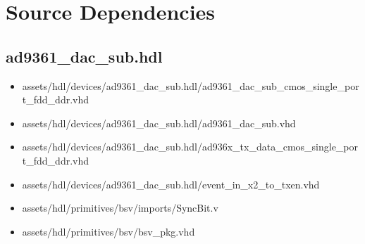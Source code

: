 \documentclass{article}
\def\comp{ad9361\_dac\_sub}
\begin{document}
\section*{Source Dependencies}
\subsection*{\comp.hdl}
\begin{itemize}
	\item assets/hdl/devices/ad9361\_dac\_sub.hdl/ad9361\_dac\_sub\_cmos\_single\_port\_fdd\_ddr.vhd
	\item assets/hdl/devices/ad9361\_dac\_sub.hdl/ad9361\_dac\_sub.vhd
	\item assets/hdl/devices/ad9361\_dac\_sub.hdl/ad936x\_tx\_data\_cmos\_single\_port\_fdd\_ddr.vhd
	\item assets/hdl/devices/ad9361\_dac\_sub.hdl/event\_in\_x2\_to\_txen.vhd

	\item assets/hdl/primitives/bsv/imports/SyncBit.v
	\item assets/hdl/primitives/bsv/bsv\_pkg.vhd
\end{itemize}
\end{document}

